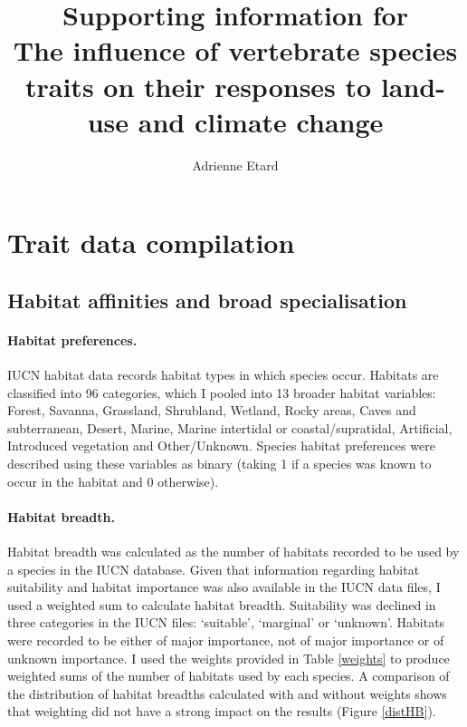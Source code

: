 \documentclass[11pt]{article}
\begin{document}
\title{\textbf{Supporting information for\\
\vspace{1cm}
The influence of vertebrate species traits on their responses to land-use and climate change
\vspace{2cm}}}

\author{Adrienne Etard}

\maketitle

\clearpage
\tableofcontents


\clearpage
\listoftables

\clearpage
\listoffigures


\clearpage

\section{Trait data compilation}

\subsection{Habitat affinities and broad specialisation}
\paragraph{Habitat preferences.}
IUCN habitat data records habitat types in which species occur. Habitats are classified into 96 categories, which I pooled into 13 broader habitat variables: 
Forest, Savanna, Grassland, Shrubland, Wetland, Rocky areas, Caves and subterranean, Desert, Marine, Marine intertidal or coastal/supratidal, Artificial, Introduced vegetation and Other/Unknown. Species habitat preferences were described using these variables as binary (taking 1 if a species was known to occur in the habitat and 0 otherwise).
\paragraph{Habitat breadth.}
Habitat breadth was calculated as the number of habitats recorded to be used by a species in the IUCN database. Given that information regarding habitat suitability and habitat importance was also available in the IUCN data files, I used a weighted sum to calculate habitat breadth. Suitability was declined in three categories in the IUCN files: `suitable', `marginal' or  `unknown'. Habitats were recorded to be either of major importance, not of major importance or of unknown importance. I used the weights provided in Table \ref{weights} to produce weighted sums of the number of habitats used by each species. A comparison of the distribution of habitat breadths calculated with and without weights shows that weighting did not have a strong impact on the results (Figure \ref{distHB}).
\end{document}
